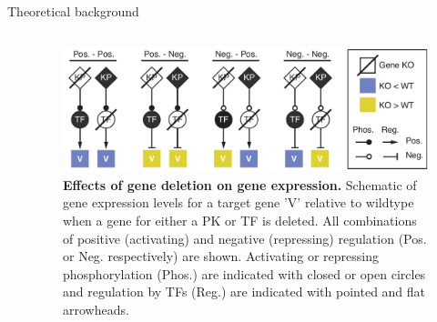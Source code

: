 \begin{frame}{Theoretical background}
\begin{columns}
\begin{column}{0.5\textwidth}


\end{column}
\begin{column}{0.5\textwidth}
\begin{figure}[ht]
    \centering
    \includegraphics[width=\textwidth]{introduction/fig/Fig1.pdf}
    \caption{\textbf{Effects of gene deletion on gene expression.} Schematic of gene expression levels for a target gene ’V’ relative to wildtype when a gene for either a PK or TF is deleted. All combinations of positive (activating) and negative (repressing) regulation (Pos. or Neg. respectively) are shown. Activating or repressing phosphorylation (Phos.) are indicated with closed or open circles and regulation by TFs (Reg.) are indicated with pointed and flat arrowheads.}
    \label{fig:gene_deletion}
\end{figure}
\end{column}
\end{columns}
\end{frame}




